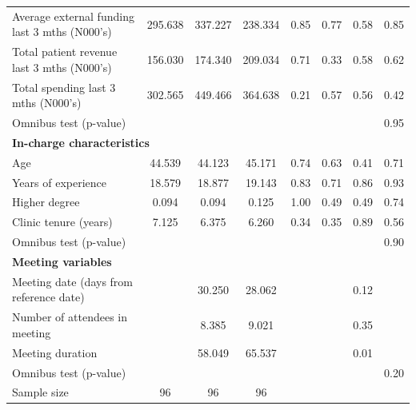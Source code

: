 \begin{tabular}{lccccccc}
Average external funding last 3 mths (N000's) & 295.638 & 337.227  & 238.334 & 0.85 & 0.77 & 0.58 & 0.85\\
Total patient revenue last 3 mths (N000's) & 156.030 & 174.340  & 209.034 & 0.71 & 0.33 & 0.58 & 0.62\\
Total spending last 3 mths (N000's) & 302.565 & 449.466  & 364.638 & 0.21 & 0.57 & 0.56 & 0.42\\
 Omnibus test (p-value) &   &   &  &  &  &  & 0.95  \\
\midrule 
\multicolumn{8}{p{0.99\textwidth}}{\textbf{In-charge characteristics}} \\Age & 44.539 & 44.123  & 45.171 & 0.74 & 0.63 & 0.41 & 0.71\\
Years of experience & 18.579 & 18.877  & 19.143 & 0.83 & 0.71 & 0.86 & 0.93\\
Higher degree & 0.094 & 0.094  & 0.125 & 1.00 & 0.49 & 0.49 & 0.74\\
Clinic tenure (years) & 7.125 & 6.375  & 6.260 & 0.34 & 0.35 & 0.89 & 0.56\\
 Omnibus test (p-value) &   &   &  &  &  &  & 0.90  \\
\midrule 
\multicolumn{8}{p{0.99\textwidth}}{\textbf{Meeting variables}} \\Meeting date (days from reference date) &  & 30.250  & 28.062 &  &  & 0.12 & \\
Number of attendees in meeting &  & 8.385  & 9.021 &  &  & 0.35 & \\
Meeting duration &  & 58.049  & 65.537 &  &  & 0.01 & \\
 Omnibus test (p-value) &   &   &  &  &  &  & 0.20  \\
\midrule 
 Sample size & 96 & 96  & 96 &  &  &  &  \\
 \bottomrule 
\end{tabular} 
